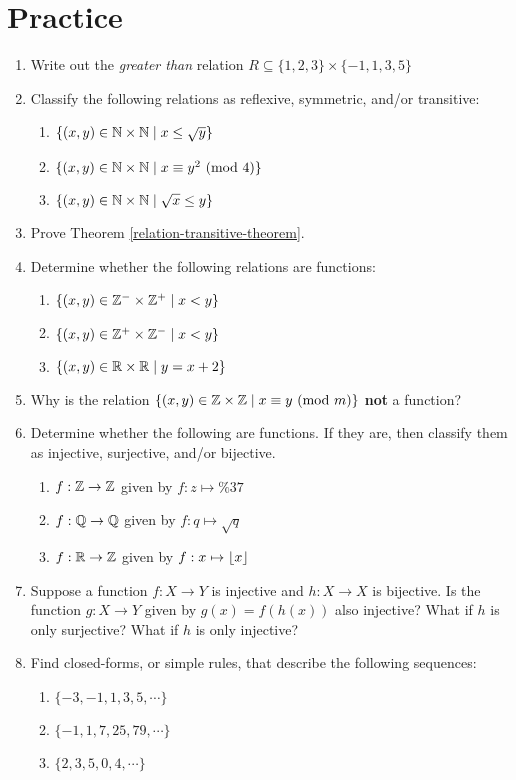 \documentclass[main.tex]{subfiles}
\begin{document}
\section{Practice}

\begin{enumerate}
	\item Write out the \textit{greater than} relation \(R \subseteq \{1,2,3\} \times \{-1,1,3,5\}\)
	\item Classify the following relations as reflexive, symmetric, and/or transitive:
	\begin{enumerate}
		\item \(\{(x,y) \in \mathbb{N} \times \mathbb{N} \mid x \leq \sqrt{y}\}\)
		\item \(\{(x,y) \in \mathbb{N} \times \mathbb{N} \mid x \equiv y^2 \ (\mathrm{mod}\ 4)\}\)
		\item \(\{(x,y) \in \mathbb{N} \times \mathbb{N} \mid \sqrt{x} \leq y\}\)
	\end{enumerate}
	\item Prove Theorem \ref{relation-transitive-theorem}.
	\item Determine whether the following relations are functions:
	\begin{enumerate}
		\item \(\{(x,y) \in \mathbb{Z}^- \times \mathbb{Z}^+ \mid x < y\}\)
		\item \(\{(x,y) \in \mathbb{Z}^+ \times \mathbb{Z}^- \mid x < y\}\)
		\item \(\{(x,y) \in \mathbb{R}   \times \mathbb{R}   \mid y = x + 2\}\)
	\end{enumerate}
	\item Why is the relation \(\{(x,y) \in \mathbb{Z} \times \mathbb{Z} \mid x \equiv y \ (\mathrm{mod}\ m)\}\) \textbf{not} a function?
	\item Determine whether the following are functions. If they are, then classify them as injective, surjective, and/or bijective.
	\begin{enumerate}
		\item \(f : \mathbb{Z} \rightarrow \mathbb{Z}\) given by \(f : z \mapsto \% 37\)
		\item \(f : \mathbb{Q} \rightarrow \mathbb{Q}\) given by \(f : q \mapsto \sqrt{q}\)
		\item \(f : \mathbb{R} \rightarrow \mathbb{Z}\) given by \(f : x \mapsto \lfloor x\rfloor\)
	\end{enumerate}
	\item Suppose a function \(f : X \rightarrow Y\) is injective and \(h : X \rightarrow X\) is bijective. Is the function \(g : X \rightarrow Y\) given by \(g(x) = f(h(x))\) also injective? What if \(h\) is only surjective? What if \(h\) is only injective? %
	\item Find closed-forms, or simple rules, that describe the following sequences:
	\begin{enumerate}
		\item \(\{-3,-1,1,3,5,\cdots\}\) %
		\item \(\{-1, 1, 7, 25, 79, \cdots\}\) %
		\item \(\{2,3,5,0,4,\cdots\}\) %
	\end{enumerate}
\end{enumerate}
\end{document}
